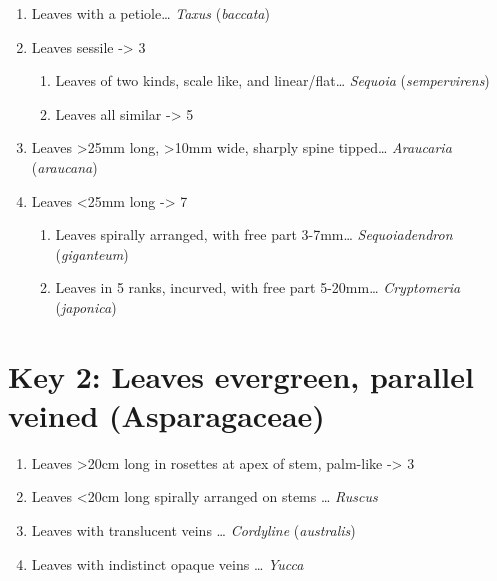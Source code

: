 \documentclass[openany]{book}
\providecommand{\tightlist}{%
  \setlength{\itemsep}{0pt}\setlength{\parskip}{0pt}}
\begin{document}
\begin{enumerate}
\def\labelenumi{\arabic{enumi}.}
\tightlist
\item
  Leaves with a petiole\ldots{} \emph{Taxus} (\emph{baccata})
\item
  Leaves sessile -\textgreater{} 3

  \begin{enumerate}
  \def\labelenumii{\arabic{enumii}.}
  \setcounter{enumii}{2}
  \tightlist
  \item
    Leaves of two kinds, scale like, and linear/flat\ldots{} \emph{Sequoia} (\emph{sempervirens})
  \item
    Leaves all similar -\textgreater{} 5
  \end{enumerate}
\item
  Leaves \textgreater{}25mm long, \textgreater{}10mm wide, sharply spine tipped\ldots{} \emph{Araucaria} (\emph{araucana})
\item
  Leaves \textless{}25mm long -\textgreater{} 7

  \begin{enumerate}
  \def\labelenumii{\arabic{enumii}.}
  \setcounter{enumii}{6}
  \tightlist
  \item
    Leaves spirally arranged, with free part 3-7mm\ldots{} \emph{Sequoiadendron} (\emph{giganteum})
  \item
    Leaves in 5 ranks, incurved, with free part 5-20mm\ldots{} \emph{Cryptomeria} (\emph{japonica})
  \end{enumerate}
\end{enumerate}

\hypertarget{key-2-leaves-evergreen-parallel-veined-asparagaceae}{%
\chapter*{Key 2: Leaves evergreen, parallel veined (Asparagaceae)}\label{key-2-leaves-evergreen-parallel-veined-asparagaceae}}

\begin{enumerate}
\def\labelenumi{\arabic{enumi}.}
\tightlist
\item
  Leaves \textgreater{}20cm long in rosettes at apex of stem, palm-like -\textgreater{} 3
\item
  Leaves \textless{}20cm long spirally arranged on stems \ldots{} \emph{Ruscus}
\item
  Leaves with translucent veins \ldots{} \emph{Cordyline} (\emph{australis})
\item
  Leaves with indistinct opaque veins \ldots{} \emph{Yucca}
\end{enumerate}
\end{document}
